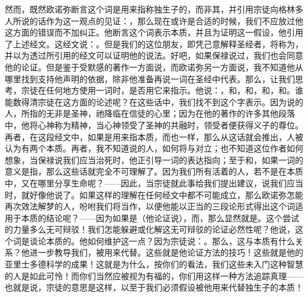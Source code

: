 然而，既然欧诺弥断言这个词是用来指称独生子的，而非其，并引用宗徒向格林多人所说的话作为这一观点的见证：，那么现在或许是合适的时候，我们不应放过他这方面的错误而不加纠正。他断言这个词表示本质，并且为证明这一假设，他引用了上述经文。这经文说：。但是我们的这位朋友，即凭己意解释圣经者，将称为，并以为透过所引用的经文可以证明他的说法。好吧，如果保禄说过，我们也会同意他的论证。但是鉴于受默感的著作一方面说，而欧诺弥另一方面说，我不知道他从哪里找到支持他声明的依据，除非他准备再说一词在圣经中代表。那么，让我们思考，宗徒在任何地方使用一词时，是否用它来指示。他说：，和，和，和，和。谁能数得清宗徒在这方面的论述呢？在这些话中，我们找不到这个字表示。因为说的人，所指的无非是圣神，祂降临在信徒的心里；因为在他的著作的许多其他段落中，他将心神称为精神，当心神领受了圣神的共融时，领受者便获得义子的尊位。再者，在这段经文中，如果是用来指本质，而也一样，那么从这话就会推出，人被认为有两个本质。再者，我不知道说的人，如何将与对立；也不知道这位作者如何想象，当保禄说我们应当治死时，他正引导一词的表达指向；至于和，如果一词的意义是指，那么这些话就完全不可理解了。因为我们所有活着的人，若不是在本质中，又在哪里分享生命呢？——因此，当宗徒就此事给我们提出建议，说我们应当时，就好像他说了。如果这样的理解在任何经文中都不可能成立，那么欧诺弥怎能再次效法解梦的人，吩咐我们将当作，以便他能以正当的三段论形式得出这个词适用于本质的结论呢？——因为如果是（他论证说），而，那么显然就是。这个尝试的力量多么无可辩驳！我们怎能躲避或化解这无可辩驳的论证必然性呢？他说，这个词是谈论本质的。他如何维护这一点？因为宗徒说：。那么，这与本质有什么关系？他进一步教导我们，被用来代替。这些就是他论证方法的技巧！这些就是他的亚里士多德科学的成果！这就是为什么，按你们的看法，我们这些未入门这种智慧的人是如此可怜！而你们当然应被视为有福的，你们用这样一种方法追踪真理——也就是说，宗徒的意思是这样，以至于我们必须假设被他用来代替独生子的本质！\par

